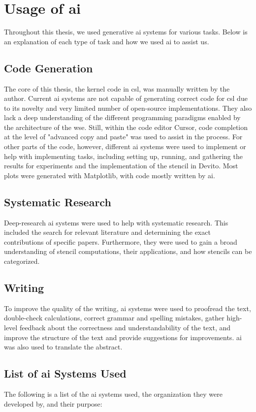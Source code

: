 \chapter{Usage of \ac{ai}}
Throughout this thesis, we used generative \ac{ai} systems for various tasks.
Below is an explanation of each type of task and how we used \ac{ai} to assist us.

\section{Code Generation}
The core of this thesis, the kernel code in \ac{csl}, was manually written by the author. Current \ac{ai} systems are not capable of generating correct code for \ac{csl} due to its novelty and very limited number of open-source implementations. They also lack a deep understanding of the different programming paradigms enabled by the architecture of the \ac{wse}. Still, within the code editor Cursor, code completion at the level of "advanced copy and paste" was used to assist in the process. For other parts of the code, however, different \ac{ai} systems were used to implement or help with implementing tasks, including setting up, running, and gathering the results for experiments and the implementation of the stencil in Devito. Most plots were generated with Matplotlib, with code mostly written by \ac{ai}.

\section{Systematic Research}
Deep-research \ac{ai} systems were used to help with systematic research. This included the search for relevant literature and determining the exact contributions of specific papers. Furthermore, they were used to gain a broad understanding of stencil computations, their applications, and how stencils can be categorized.

\section{Writing}
To improve the quality of the writing, \ac{ai} systems were used to proofread the text, double-check calculations, correct grammar and spelling mistakes, gather high-level feedback about the correctness and understandability of the text, and improve the structure of the text and provide suggestions for improvements. \ac{ai} was also used to translate the abstract.

\section{List of \ac{ai} Systems Used}
The following is a list of the \ac{ai} systems used, the organization they were developed by, and their purpose:

